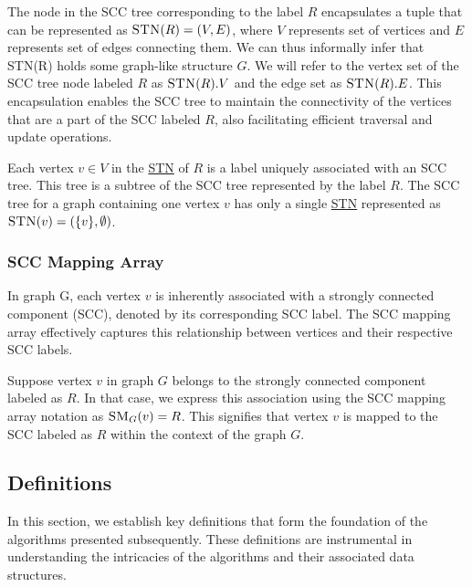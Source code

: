 The node in the SCC tree corresponding to the label $R$ encapsulates a tuple that can be represented as $\text{\textsc{STN}}(R) = \left( V, E \right)$, 
where $V$ represents set of vertices and $E$ represents set of edges connecting them. We can thus informally infer that \textsc{STN}(R) holds some graph-like structure $G$.
We will refer to the vertex set of the SCC tree node labeled $R$ as $\text{\textsc{STN}}(R).V$ and the edge set as $\text{\textsc{STN}}(R).E$.
This encapsulation enables the SCC tree to maintain the connectivity of the vertices that are a part of the SCC labeled $R$,
also facilitating efficient traversal and update operations.

Each vertex $v \in V$ in the \hyperref[stn]{STN} of $R$ is a label uniquely associated with an SCC tree. 
This tree is a subtree of the SCC tree represented by the label $R$.
The SCC tree for a graph containing one vertex $v$ has only a single \hyperref[stn]{STN} represented as $\text{\textsc{STN}}(v) = (\{v\}, \emptyset)$.



\subsubsection{SCC Mapping Array}\label{Subsubsec: SCC Mapping Array}
In graph G, each vertex $v$ is inherently associated with a strongly connected component (SCC), denoted by its corresponding SCC label. 
The SCC mapping array effectively captures this relationship between vertices and their respective SCC labels.

Suppose vertex $v$ in graph $G$ belongs to the strongly connected component labeled as $R$.
 In that case, we express this association using the SCC mapping array notation as $\text{\textsc{SM}}_{G}(v)=R$. 
 This signifies that vertex $v$ is mapped to the SCC labeled as $R$ within the context of the graph $G$.


\subsection{Definitions}\label{Subsec: Definitions Theoretical}
In this section, we establish key definitions that form the foundation of the algorithms presented subsequently. 
These definitions are instrumental in understanding the intricacies of the algorithms and their associated data structures.

